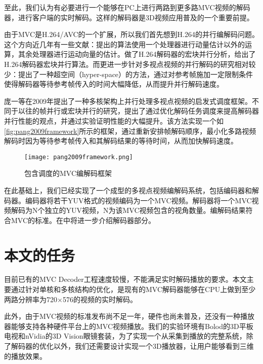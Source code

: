 至此，我们认为有必要进行一个能够在PC上进行两路到更多路MVC视频的解码器，进行客户端的实时解码。这样的解码器是3D视频应用普及的一个重要前提。

由于MVC是H.264/AVC的一个扩展，所以我们首先想到H.264的并行编解码问题。这个方向近几年有一些文献：提出的算法使用一个处理器进行动量估计以外的运算，其余处理器进行运动向量的估计。做了H.264解码器的宏块并行分析，给出了H.264解码器宏块并行算法。而更进一步针对多视点视频的并行解码的研究相对较少：提出了一种超空间（hyper-space）的方法，通过对参考帧施加一定限制条件使得解码器等待参考帧传入的时间大幅降低，从而提升并行解码速度。

庞一等在2009年提出了一种多核架构上并行处理多视点视频的启发式调度框架\cite{pang2009framework}。不同于以往的帧并行或宏块并行的研究，提出了通过优化解码任务调度来提高解码器并行性能的观点，并通过实验证明性能的大幅提升。该方法实现一个如\autoref{fig:pang2009framework}所示的框架，通过重新安排帧解码顺序，最小化多路视频解码时因为等待参考帧传入和其解码结果的等待时间，从而加快解码速度。
\begin{figure}[htbp]
\begin{center}
\texttt{[image: pang2009framework.png]}
\caption{包含调度的MVC编解码框架}
\label{fig:pang2009framework}
\end{center}
\end{figure}


在此基础上，我们已经实现了一个成型的多视点视频编解码系统，包括编码器和解码器。编码器将若干YUV格式的视频编码为一个MVC视频。解码器将一个MVC视频解码为N个独立的YUV视频，N为该MVC视频包含的视角数量。编解码结果符合MVC的标准\cite{iso2009mvc}。在中将进一步介绍解码器部分。

\section{本文的任务}
\label{sec:workbrief}

目前已有的MVC Decoder工程速度较慢，不能满足实时解码播放的要求。本文主要通过针对单核和多核结构的优化，是现有的MVC解码器能够在CPU上做到至少两路分辨率为720$\times$576的视频的实时解码。

此外，由于MVC视频的标准\cite{iso2009mvc}发布尚不足一年，硬件也尚未普及，还没有一种播放器能够支持各种硬件平台上的MVC视频播放。我们的实验环境有Bolod的3D平板电视和nVidia的3D Vision眼镜套装，为了实现一个从采集到播放的完整系统，除了解码器的优化以外，我们还需要设计实现一个3D播放器，让用户能够看到三维的播放效果。


